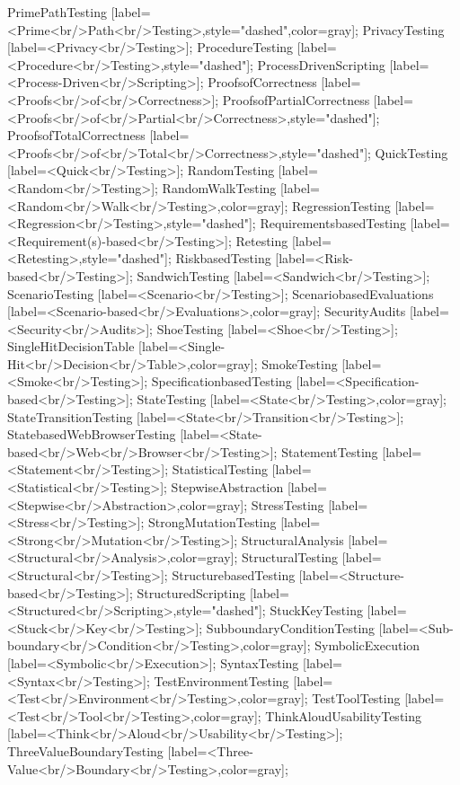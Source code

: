 \documentclass{article}
\begin{document}
{PrimePathTesting [label=<Prime<br/>Path<br/>Testing>,style="dashed",color=gray];
PrivacyTesting [label=<Privacy<br/>Testing>];
ProcedureTesting [label=<Procedure<br/>Testing>,style="dashed"];
ProcessDrivenScripting [label=<Process-Driven<br/>Scripting>];
ProofsofCorrectness [label=<Proofs<br/>of<br/>Correctness>];
ProofsofPartialCorrectness [label=<Proofs<br/>of<br/>Partial<br/>Correctness>,style="dashed"];
ProofsofTotalCorrectness [label=<Proofs<br/>of<br/>Total<br/>Correctness>,style="dashed"];
QuickTesting [label=<Quick<br/>Testing>];
RandomTesting [label=<Random<br/>Testing>];
RandomWalkTesting [label=<Random<br/>Walk<br/>Testing>,color=gray];
RegressionTesting [label=<Regression<br/>Testing>,style="dashed"];
RequirementsbasedTesting [label=<Requirement(s)-based<br/>Testing>];
Retesting [label=<Retesting>,style="dashed"];
RiskbasedTesting [label=<Risk-based<br/>Testing>];
SandwichTesting [label=<Sandwich<br/>Testing>];
ScenarioTesting [label=<Scenario<br/>Testing>];
ScenariobasedEvaluations [label=<Scenario-based<br/>Evaluations>,color=gray];
SecurityAudits [label=<Security<br/>Audits>];
ShoeTesting [label=<Shoe<br/>Testing>];
SingleHitDecisionTable [label=<Single-Hit<br/>Decision<br/>Table>,color=gray];
SmokeTesting [label=<Smoke<br/>Testing>];
SpecificationbasedTesting [label=<Specification-based<br/>Testing>];
StateTesting [label=<State<br/>Testing>,color=gray];
StateTransitionTesting [label=<State<br/>Transition<br/>Testing>];
StatebasedWebBrowserTesting [label=<State-based<br/>Web<br/>Browser<br/>Testing>];
StatementTesting [label=<Statement<br/>Testing>];
StatisticalTesting [label=<Statistical<br/>Testing>];
StepwiseAbstraction [label=<Stepwise<br/>Abstraction>,color=gray];
StressTesting [label=<Stress<br/>Testing>];
StrongMutationTesting [label=<Strong<br/>Mutation<br/>Testing>];
StructuralAnalysis [label=<Structural<br/>Analysis>,color=gray];
StructuralTesting [label=<Structural<br/>Testing>];
StructurebasedTesting [label=<Structure-based<br/>Testing>];
StructuredScripting [label=<Structured<br/>Scripting>,style="dashed"];
StuckKeyTesting [label=<Stuck<br/>Key<br/>Testing>];
SubboundaryConditionTesting [label=<Sub-boundary<br/>Condition<br/>Testing>,color=gray];
SymbolicExecution [label=<Symbolic<br/>Execution>];
SyntaxTesting [label=<Syntax<br/>Testing>];
TestEnvironmentTesting [label=<Test<br/>Environment<br/>Testing>,color=gray];
TestToolTesting [label=<Test<br/>Tool<br/>Testing>,color=gray];
ThinkAloudUsabilityTesting [label=<Think<br/>Aloud<br/>Usability<br/>Testing>];
ThreeValueBoundaryTesting [label=<Three-Value<br/>Boundary<br/>Testing>,color=gray];
}
\end{document}
